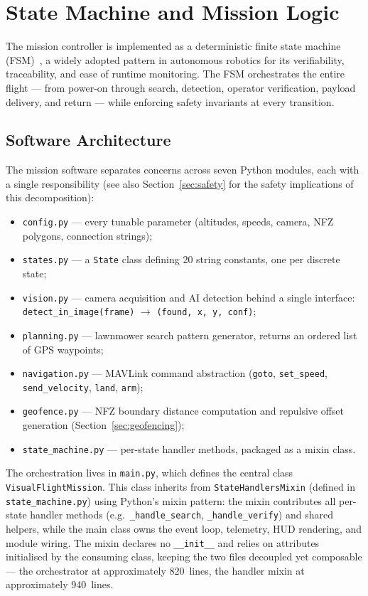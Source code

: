 \section{State Machine and Mission Logic}\label{sec:statemachine}

The mission controller is implemented as a deterministic finite state machine (FSM)~\cite{wagner2006fsm}, a widely adopted pattern in autonomous robotics for its verifiability, traceability, and ease of runtime monitoring. The FSM orchestrates the entire flight --- from power-on through search, detection, operator verification, payload delivery, and return --- while enforcing safety invariants at every transition.

\subsection{Software Architecture}\label{subsec:arch}

The mission software separates concerns across seven Python modules, each with a single responsibility (see also Section~\ref{sec:safety} for the safety implications of this decomposition):

\begin{itemize}
    \item \texttt{config.py} --- every tunable parameter (altitudes, speeds, camera, NFZ polygons, connection strings);
    \item \texttt{states.py} --- a \texttt{State} class defining 20 string constants, one per discrete state;
    \item \texttt{vision.py} --- camera acquisition and AI detection behind a single interface: \texttt{detect\_in\_image(frame)} $\rightarrow$ \texttt{(found, x, y, conf)};
    \item \texttt{planning.py} --- lawnmower search pattern generator, returns an ordered list of GPS waypoints;
    \item \texttt{navigation.py} --- MAVLink command abstraction (\texttt{goto}, \texttt{set\_speed}, \texttt{send\_velocity}, \texttt{land}, \texttt{arm});
    \item \texttt{geofence.py} --- NFZ boundary distance computation and repulsive offset generation (Section~\ref{sec:geofencing});
    \item \texttt{state\_machine.py} --- per-state handler methods, packaged as a mixin class.
\end{itemize}

\noindent The orchestration lives in \texttt{main.py}, which defines the central class \texttt{VisualFlightMission}. This class inherits from \texttt{StateHandlersMixin} (defined in \texttt{state\_machine.py}) using Python's mixin pattern: the mixin contributes all per-state handler methods (e.g.\ \texttt{\_handle\_search}, \texttt{\_handle\_verify}) and shared helpers, while the main class owns the event loop, telemetry, HUD rendering, and module wiring. The mixin declares no \texttt{\_\_init\_\_} and relies on attributes initialised by the consuming class, keeping the two files decoupled yet composable --- the orchestrator at approximately 820~lines, the handler mixin at approximately 940~lines.

